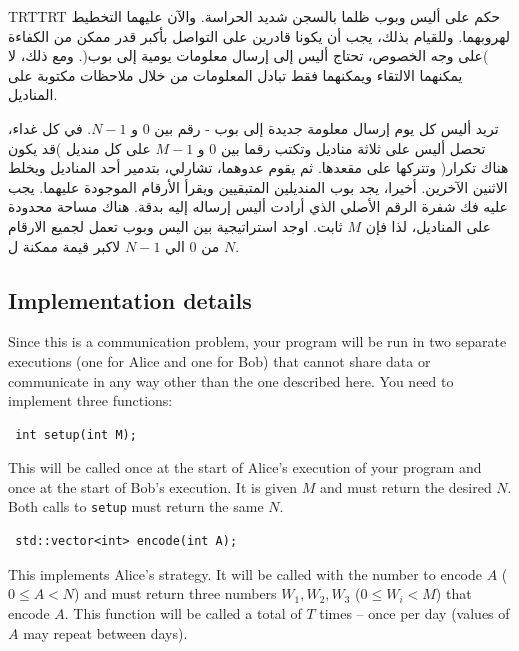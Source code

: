 \documentclass[12pt]{article}
\newenvironment{Arabic}     %
    {\textdir TRT\pardir TRT\arabicfont}{}
\begin{document}
\renewcommand{\round}{Day 1}
\renewcommand{\problemName}{Task Prison}
\renewcommand{\lang}{Arabic}

\renewcommand{\tl}{$2$ sec.}
\renewcommand{\ml}{$1024$ MB}
\problem{\problemName}

\begin{Arabic}
حكم على أليس وبوب ظلما بالسجن شديد الحراسة. والآن عليهما التخطيط لهروبهما. وللقيام بذلك، يجب أن يكونا قادرين على التواصل بأكبر قدر ممكن من الكفاءة )على وجه الخصوص، تحتاج أليس إلى إرسال معلومات يومية إلى بوب(. ومع ذلك، لا يمكنهما الالتقاء ويمكنهما فقط تبادل المعلومات من خلال ملاحظات مكتوبة على المناديل.


تريد أليس كل يوم إرسال معلومة جديدة إلى بوب - رقم بين $0$ و $N-1$. في كل غداء، تحصل أليس على ثلاثة مناديل وتكتب رقما بين $0$ و $M-1$ على كل منديل )قد يكون هناك تكرار( وتتركها على مقعدها. ثم يقوم عدوهما، تشارلي، بتدمير أحد المناديل ويخلط الاثنين الآخرين. أخيرا، يجد بوب المنديلين المتبقيين ويقرأ الأرقام الموجودة عليهما. يجب عليه فك شفرة الرقم الأصلي الذي أرادت أليس إرساله إليه بدقة. هناك مساحة محدودة على المناديل، لذا فإن $M$ ثابت. اوجد استراتيجية بين اليس وبوب تعمل لجميع الارقام من $0$ الي $N-1$ لاكبر قيمة ممكنة ل $N$.
\end{Arabic}

\subsection{Implementation details}
Since this is a communication problem, your program will be run in two separate executions (one for Alice and one for Bob) that cannot share data or communicate in any way other than the one described here. You need to implement three functions:

\begin{lstlisting}
 int setup(int M);
\end{lstlisting}

This will be called once at the start of Alice's execution of your program and once at the start of Bob's execution. It is given $M$ and must return the desired $N$. Both calls to \texttt{setup} must return the same $N$.

\begin{lstlisting}
 std::vector<int> encode(int A);
\end{lstlisting}

This implements Alice's strategy. It will be called with the number to encode $A$ ($0 \leq A < N$) and must return three numbers $W_1, W_2, W_3$ ($0 \leq W_i < M$) that encode $A$. This function will be called a total of $T$ times -- once per day (values of $A$ may repeat between days).
\end{document}
